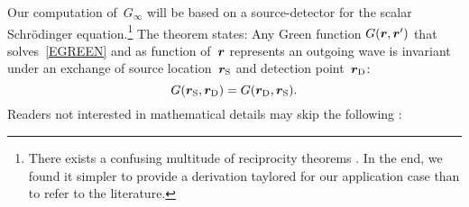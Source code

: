 %
%

Our computation of~$G_\infty$ will be based on a source-detector 
for the scalar Schrödinger equation.\footnote
{There exists a confusing multitude of reciprocity theorems \cite{Pot04}.
In the end, we found it simpler to provide a derivation taylored for our application case
than to refer to the literature.}
The theorem states:
Any Green function $G(\bm{r},\bm{r}')$
that solves~\cref{EGREEN} and as function of~$\bm{r}$ represents an outgoing wave
is invariant under an exchange of source location~$\bm{r}_\text{S}$ and detection point~$\bm{r}_\text{D}$:
%
%
\begin{equation}\label{Erecip}
  G(\bm{r}_\text{S},\bm{r}_\text{D}) = G(\bm{r}_\text{D},\bm{r}_\text{S}).
\end{equation}
Readers not interested in mathematical details may skip the following :

